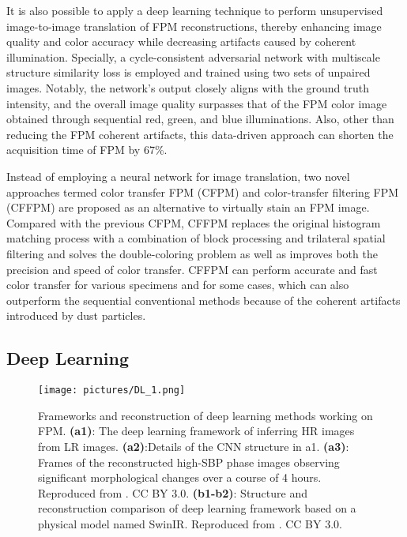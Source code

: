\documentclass[journal,review,submit,pdftex,moreauthors]{Definitions/mdpi}
\begin{document}
It is also possible to apply a deep learning technique to perform unsupervised image-to-image translation of FPM reconstructions, thereby enhancing image quality and color accuracy while decreasing artifacts caused by coherent illumination\cite{zhu2017unpaired,wang2020virtual}. Specially, a cycle-consistent adversarial network with multiscale structure similarity loss is employed and trained using two sets of unpaired images. Notably, the network's output closely aligns with the ground truth intensity, and the overall image quality surpasses that of the FPM color image obtained through sequential red, green, and blue illuminations. Also, other than reducing the FPM coherent artifacts, this data-driven approach can shorten the acquisition time of FPM by 67\%.

Instead of employing a neural network for image translation, two novel approaches termed color transfer FPM (CFPM) and color-transfer filtering FPM (CFFPM) are proposed as an alternative to virtually stain an FPM image\cite{gao2021high,chen2022rapid}. Compared with the previous CFPM, CFFPM replaces the original histogram matching process with a combination of block processing and trilateral spatial filtering and solves the double-coloring problem as well as improves both the precision and speed of color transfer. CFFPM can perform accurate and fast color transfer for various specimens and for some cases, which can also outperform the sequential conventional methods because of the coherent artifacts introduced by dust particles.

\subsection{Deep Learning}

\begin{figure}[H]
\texttt{[image: pictures/DL\_1.png]}
\caption{Frameworks and reconstruction of deep learning methods working on FPM. \textbf{(a1)}: The deep learning framework of inferring HR images from LR images. \textbf{(a2)}:Details of the CNN structure in a1. \textbf{(a3)}: Frames of the reconstructed high-SBP phase images observing significant morphological changes over a  course of 4 hours. Reproduced from \cite{thanh2018deep}. CC BY 3.0. \textbf{(b1-b2)}: Structure and reconstruction comparison of deep learning framework based on a physical model named SwinIR. Reproduced from \cite{wang2022fourier}. CC BY 3.0.
\label{dp}}
\end{figure}
\end{document}
